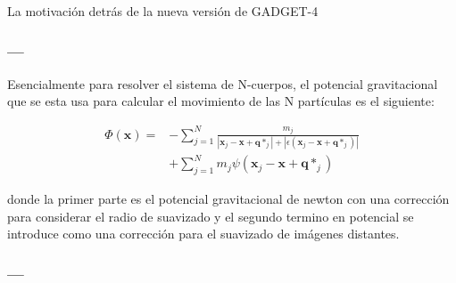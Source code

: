 La motivación detrás de la nueva versión de GADGET-4
\cite{2021MNRAS.506.2871S}






\subsubsection{---}
Esencialmente para resolver el sistema de N-cuerpos, el potencial gravitacional que se esta usa para calcular el movimiento de las N partículas es el siguiente:

\begin{align}
    \Phi (\textbf{x}) = &- \sum_{j=1}^{N} \frac{m_j}{|\textbf{x}_j-\textbf{x}+\textbf{q}*_j| + |\epsilon(\textbf{x}_j-\textbf{x}+\textbf{q}*_j)|} \nonumber \\
    &+ \sum_{j=1}^{N} m_j \psi (\textbf{x}_j-\textbf{x}+\textbf{q}*_j)
\end{align}

donde la primer parte es el potencial gravitacional de newton con una corrección para considerar el radio de suavizado y el segundo termino en potencial se introduce como una corrección para el suavizado de imágenes distantes.


\subsubsection{---}
